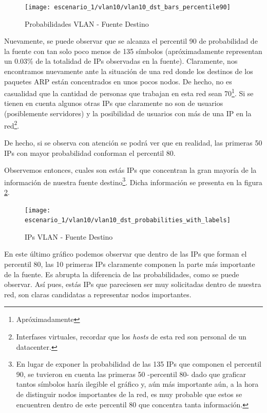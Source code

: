 \begin{figure}[!ht]
    \centering
    \texttt{[image: escenario\_1/vlan10/vlan10\_dst\_bars\_percentile90]}
    \caption{Probabilidades VLAN  - Fuente Destino}
    \label{fig:vlan10_dst_prob_per90}
\end{figure}

\par Nuevamente, se puede observar que se alcanza el percentil 90 de probabilidad de la
fuente con tan solo poco menos de 135 s\'imbolos (apr\'oximadamente representan un
0.03\% de la totalidad de IPs observadas en la fuente). Claramente, nos encontramos
nuevamente ante la situaci\'on de una red donde los destinos de los paquetes ARP
est\'an concentrados en unos pocos nodos. De hecho, no es casualidad que la cantidad
de personas que trabajan en esta red sean 70\footnote{Apr\'oximadamente}. Si se tienen
en cuenta algunos otras IPs que claramente no son de usuarios (posiblemente servidores)
y la posibilidad de usuarios con m\'as de una IP en la red\footnote{Interfases virtuales,
recordar que los \textit{hosts} de esta red son personal de un datacenter.}.

\par De hecho, si se observa con atenci\'on se podr\'a ver que en realidad, las primeras
50 IPs con mayor probabilidad conforman el percentil 80.

\par Observemos entonces, cuales son est\'as IPs que concentran la gran mayor\'ia
de la informaci\'on de nuestra fuente destino\footnote{En lugar de exponer la probabilidad
de las 135 IPs que componen el percentil 90, se tuvieron en cuenta las primeras 50 -percentil
80- dado que graficar tantos s\'imbolos har\'ia ilegible el gr\'afico y, a\'un m\'as importante
a\'un, a la hora de distinguir nodos importantes de la red, es muy probable que estos
se encuentren dentro de este percentil 80 que concentra tanta informaci\'on.}. Dicha informaci\'on
se presenta en la figura \ref{fig:vlan10_dst_prob_ips}.

\begin{figure}[!ht]
    \centering
    \texttt{[image: escenario\_1/vlan10/vlan10\_dst\_probabilities\_with\_labels]}
    \caption{IPs VLAN  - Fuente Destino}
    \label{fig:vlan10_dst_prob_ips}
\end{figure}

\par En este \'ultimo gr\'afico podemos observar que dentro de las IPs que forman el percentil 80,
las 10 primeras IPs claramente componen la parte m\'as importante de la fuente. Es abrupta
la diferencia de las probabilidades, como se puede observar. As\'i pues, est\'as IPs que 
pareciesen ser muy solicitadas dentro de nuestra red, son claras candidatas a representar
nodos importantes.


